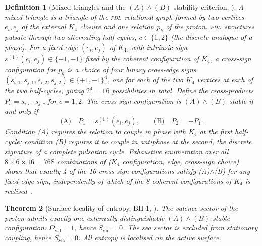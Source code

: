 \documentclass[12pt,a4paper]{article}
\newtheorem{theorem}{Theorem}[section]
\newtheorem{definition}[theorem]{Definition}
\newcommand{\Kfour}{K_4}
\newcommand{\PDL}{\textsc{pdl}}
\begin{document}
\begin{definition}[Mixed triangles and the $(A)\wedge(B)$ stability criterion, \cite{PDL_D29_2026}]
\label{def:AB}
A \emph{mixed triangle} is a triangle of the \PDL\ relational graph formed by two vertices $e_i, e_j$ of the external $\Kfour$ closure and one relation $p_k$ of the proton. \PDL\ structures pulsate through two alternating half-cycles, $c \in \{1,2\}$ (the discrete analogue of a phase). For a fixed edge $(e_i, e_j)$ of $\Kfour$, with intrinsic sign $s^{(1)}(e_i,e_j) \in \{+1,-1\}$ fixed by the coherent configuration of $\Kfour$, a \emph{cross-sign configuration} for $p_k$ is a choice of four binary cross-edge signs $(s_{i,1}, s_{j,1}, s_{i,2}, s_{j,2}) \in \{+1,-1\}^4$, one for each of the two $\Kfour$ vertices at each of the two half-cycles, giving $2^4=16$ possibilities in total. Define the cross-products $P_c = s_{i,c}\cdot s_{j,c}$ for $c=1,2$. The cross-sign configuration is \emph{$(A)\wedge(B)$-stable} if and only if
\begin{equation}
\text{(A)}\quad P_1 = s^{(1)}(e_i,e_j), \qquad \text{(B)}\quad P_2 = -P_1.
\end{equation}
Condition (A) requires the relation to couple in phase with $\Kfour$ at the first half-cycle; condition (B) requires it to couple in antiphase at the second, the discrete signature of a complete pulsation cycle. Exhaustive enumeration over all $8\times6\times16=768$ combinations of ($\Kfour$ configuration, edge, cross-sign choice) shows that exactly 4 of the 16 cross-sign configurations satisfy (A)$\wedge$(B) for any fixed edge sign, independently of which of the 8 coherent configurations of $\Kfour$ is realised~\cite{PDL_D29_2026,PDL_D50_2026}.
\end{definition}

\begin{theorem}[Surface locality of entropy, BH-1, \cite{PDL_D37_2026}]
\label{thm:BH1}
The valence sector of the proton admits exactly one externally distinguishable $(A)\wedge(B)$-stable configuration: $\Omega_{\mathrm{val}} = 1$, hence $S_{\mathrm{val}} = 0$. The sea sector is excluded from stationary coupling, hence $S_{\mathrm{sea}} = 0$. All entropy is localised on the active surface.
\end{theorem}
\end{document}
